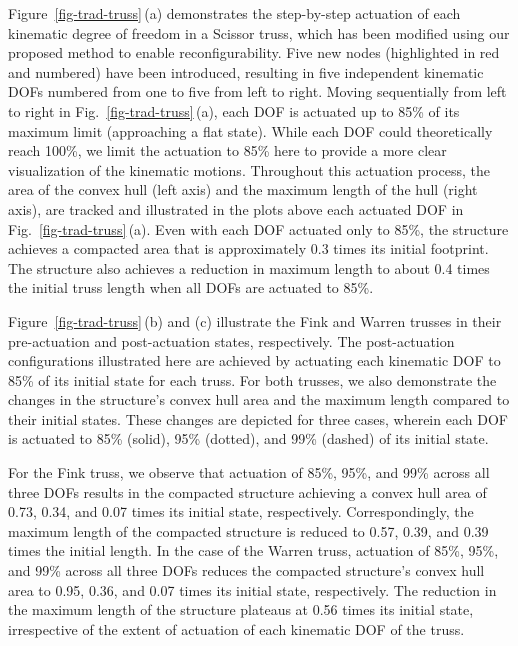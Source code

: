 Figure~\ref{fig-trad-truss}\,(a) demonstrates the step-by-step actuation of each kinematic degree of freedom in a Scissor truss, which has been modified using our proposed method to enable reconfigurability. Five new nodes (highlighted in red and numbered) have been introduced, resulting in five independent kinematic DOFs numbered from one to five from left to right. Moving sequentially from left to right in Fig.~\ref{fig-trad-truss}\,(a), each DOF is actuated up to 85\% of its maximum limit (approaching a flat state). While each DOF could theoretically reach 100\%, we limit the actuation to 85\% here to provide a more clear visualization of the kinematic motions. Throughout this actuation process, the area of the convex hull (left axis) and the maximum length of the hull (right axis), are tracked and illustrated in the plots above each actuated DOF in Fig.~\ref{fig-trad-truss}\,(a). Even with each DOF actuated only to 85\%, the structure achieves a compacted area that is approximately 0.3 times its initial footprint. The structure also achieves a reduction in maximum length to about 0.4 times the initial truss length when all DOFs are actuated to 85\%.

Figure~\ref{fig-trad-truss}\,(b) and (c) illustrate the Fink and Warren trusses in their pre-actuation and post-actuation states, respectively. The post-actuation configurations illustrated here are achieved by actuating each kinematic DOF to 85\% of its initial state for each truss. For both trusses, we also demonstrate the changes in the structure's convex hull area and the maximum length compared to their initial states. These changes are depicted for three cases, wherein each DOF is actuated to 85\% (solid), 95\% (dotted), and 99\% (dashed) of its initial state.

For the Fink truss, we observe that actuation of 85\%, 95\%, and 99\% across all three DOFs results in the compacted structure achieving a convex hull area of 0.73, 0.34, and 0.07 times its initial state, respectively. Correspondingly, the maximum length of the compacted structure is reduced to 0.57, 0.39, and 0.39 times the initial length. In the case of the Warren truss, actuation of 85\%, 95\%, and 99\% across all three DOFs reduces the compacted structure's convex hull area to 0.95, 0.36, and 0.07 times its initial state, respectively. The reduction in the maximum length of the structure plateaus at 0.56 times its initial state, irrespective of the extent of actuation of each kinematic DOF of the truss.

